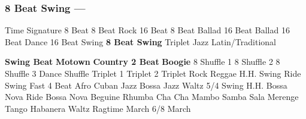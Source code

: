 \subsubsection[8 Beat Swing]{8 Beat Swing --- \UiKey{\II}\UiKey{\MET}}
Time Signature
8 Beat
8 Beat Rock
16 Beat
8 Beat Ballad
16 Beat Ballad
16 Beat Dance
16 Beat Swing
\textbf{8 Beat Swing}
Triplet
Jazz
Latin/Traditional





























\textbf{Swing Beat}
\textbf{Motown}
\textbf{Country 2 Beat}
\textbf{Boogie}
8 Shuffle 1
8 Shuffle 2
8 Shuffle 3
Dance Shuffle
Triplet 1
Triplet 2
Triplet Rock
Reggae
H.H. Swing
Ride Swing
Fast 4 Beat
Afro Cuban
Jazz Bossa
Jazz Waltz
5/4 Swing
H.H. Bossa Nova
Ride Bossa Nova
Beguine
Rhumba
Cha Cha
Mambo
Samba
Sala
Merenge
Tango
Habanera
Waltz
Ragtime
March
6/8 March
